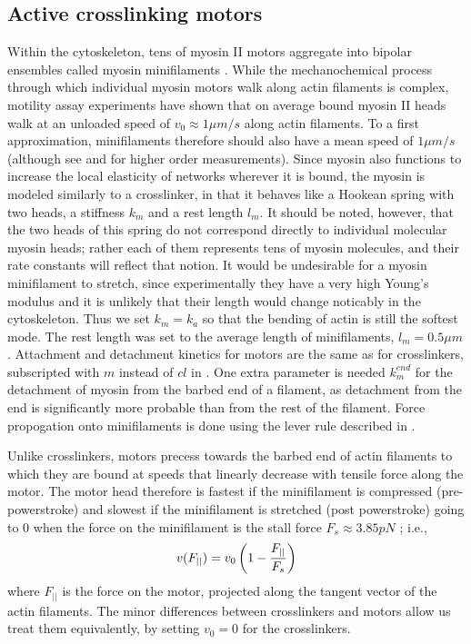 \documentclass[12pt]{article}
\begin{document}
\subsection{Active crosslinking motors}
Within the cytoskeleton, tens of myosin II motors aggregate into bipolar ensembles called myosin minifilaments
\cite{stam2015}. While the mechanochemical process through which individual myosin motors walk along actin filaments is complex, 
motility assay experiments have shown that on average bound myosin II heads walk at an unloaded speed of $v_0\approx1\mu m/s$ along actin
filaments\cite{finer1994}. To a first approximation, minifilaments therefore should also 
have a mean speed of $1\mu m/s$ (although see \cite{stam2015} and \cite{walcott2012} for higher order measurements). 
Since myosin also functions to increase the local elasticity of networks wherever it is bound, the myosin is modeled
similarly to a crosslinker, in that it behaves like a Hookean spring with two heads, a stiffness $k_{m}$ and a rest
length $l_m$. It should be noted, however, that the two heads of this spring do not correspond directly to individual
molecular myosin heads; rather each of them represents tens of myosin molecules, and their rate constants will reflect
that notion. 
It would be undesirable for a myosin minifilament to stretch, 
since experimentally they have a very high
Young's modulus and it is unlikely that their length would change noticably in the cytoskeleton. 
Thus we set $k_m=k_a$ so that the bending of actin is still the softest mode. 
The rest length was set to the average length of minifilaments, $l_m=0.5\mu m$\cite{niederman1975}.
Attachment and detachment kinetics for motors are the same as for crosslinkers, subscripted with $m$
instead of $cl$ in . One extra parameter is needed $k_m^{end}$ for the
detachment of myosin from the barbed end of a filament, as detachment from the end is significantly more probable than
from the rest of the filament.
Force propogation onto minifilaments is done using the lever rule described in .
\par
Unlike crosslinkers, motors precess towards the barbed end of actin filaments to which they are bound 
at speeds that linearly decrease with tensile force along the motor. 
The motor head therefore is fastest if the minifilament is
compressed (pre-powerstroke) and slowest if the minifilament is stretched (post powerstroke) 
going to $0$ when the force on the minifilament is the stall force $F_s\approx 3.85pN$ \cite{nedelec2002, gordon2012}; i.e.,  
\begin{equation} 
  v(F_{||}) = v_0\left( 1-{F_{||}\over F_s} \right)
    \label{eqn:myo_vel}
\end{equation} 
where $F_{||}$ is the force on the motor, projected along the tangent vector of the
actin filaments.
The minor differences between crosslinkers and motors allow us treat them equivalently, by 
setting $v_0 = 0$ for the crosslinkers.  
\end{document}
